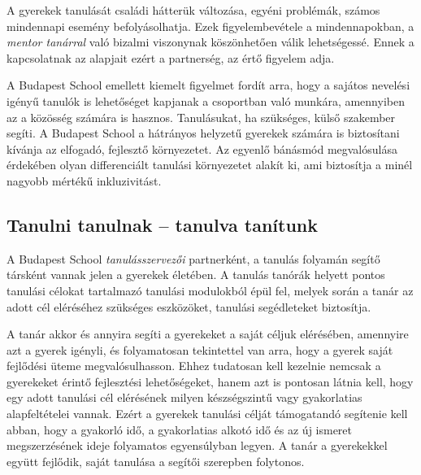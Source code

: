 A gyerekek tanulását családi hátterük változása, egyéni problémák, számos mindennapi esemény befolyásolhatja. Ezek figyelembevétele a mindennapokban, a \emph{mentor tanárral} való bizalmi viszonynak köszönhetően válik lehetségessé. Ennek a kapcsolatnak az alapjait ezért a partnerség, az értő figyelem adja.

A Budapest School emellett kiemelt figyelmet fordít arra, hogy a sajátos nevelési igényű tanulók is lehetőséget kapjanak a csoportban való munkára, amennyiben az a közösség számára is hasznos. Tanulásukat, ha szükséges, külső szakember segíti. A Budapest School a hátrányos helyzetű gyerekek számára is biztosítani kívánja az elfogadó, fejlesztő környezetet. Az egyenlő bánásmód megvalósulása érdekében olyan differenciált tanulási környezetet alakít ki, ami biztosítja a minél nagyobb mértékű inkluzivitást.

\subsection{Tanulni tanulnak -- tanulva tanítunk}
A Budapest School \emph{tanulásszervezői} partnerként, a tanulás folyamán segítő társként vannak jelen a gyerekek életében. A tanulás tanórák helyett pontos tanulási célokat tartalmazó tanulási modulokból épül fel, melyek során a tanár az adott cél eléréséhez szükséges eszközöket, tanulási segédleteket biztosítja.

A tanár akkor és annyira segíti a gyerekeket a saját céljuk elérésében, amennyire azt a gyerek igényli, és folyamatosan tekintettel van arra, hogy a gyerek saját fejlődési üteme megvalósulhasson. Ehhez tudatosan kell kezelnie nemcsak a gyerekeket érintő fejlesztési lehetőségeket, hanem azt is pontosan látnia kell, hogy egy adott tanulási cél elérésének milyen készségszintű vagy gyakorlatias alapfeltételei vannak. Ezért a gyerekek tanulási célját támogatandó segítenie kell abban, hogy a gyakorló idő, a gyakorlatias alkotó idő és az új ismeret megszerzésének ideje folyamatos egyensúlyban legyen. A tanár a gyerekekkel együtt fejlődik, saját tanulása a segítői szerepben folytonos.
